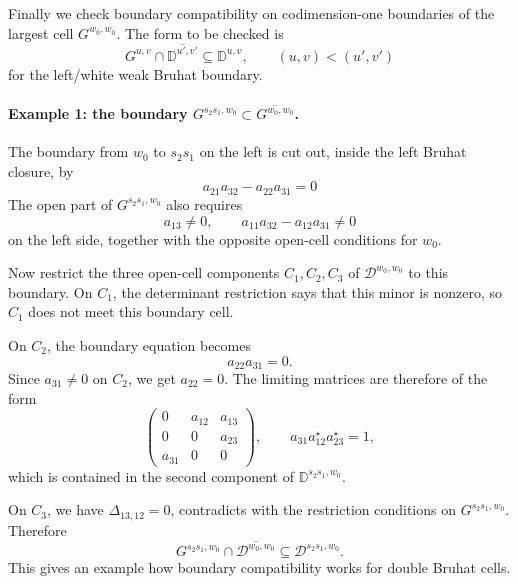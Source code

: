 \documentclass[12pt]{amsart}
\newcommand{\D}{\mathbb D}
\theoremstyle{plain}
\theoremstyle{definition}
\theoremstyle{remark}
\begin{document}
Finally we check boundary compatibility on codimension-one boundaries of the
largest cell $G^{w_0,w_0}$. The form to be checked is
\begin{equation*}
   G^{u,v}\cap \overline{\D^{u',v'}}
   \subseteq
   \D^{u,v},
   \qquad
   (u,v)<(u',v')
\end{equation*}
for the left/white weak Bruhat boundary. 

\paragraph{\bf Example 1: the boundary $G^{s_2s_1,w_0}\subset \overline{G^{w_0,w_0}}$.}
The boundary from $w_0$ to $s_2s_1$ on the left is cut out, inside the left
Bruhat closure, by
\begin{equation*}
   a_{21}a_{32}-a_{22}a_{31}=0
\end{equation*}
The open part of $G^{s_2s_1,w_0}$ also requires
\begin{equation*}
   a_{13}\neq0,\qquad
   a_{11}a_{32}-a_{12}a_{31}\neq 0
\end{equation*}
on the left side, together with the opposite open-cell conditions for $w_0$.

Now restrict the three open-cell components $C_1,C_2,C_3$ of
$\mathcal D^{w_0,w_0}$ to this boundary. On $C_1$, the determinant restriction says that this minor is nonzero, so
$C_1$ does not meet this boundary cell.

On $C_2$, the boundary equation becomes
\begin{equation*}
   a_{22}a_{31}=0.
\end{equation*}
Since $a_{31}\neq0$ on $C_2$, we get $a_{22}=0$. The limiting matrices are
therefore of the form
\begin{equation*}
\begin{pmatrix}
0&a_{12}&a_{13}\\
0&0&a_{23}\\
a_{31}&0&0
\end{pmatrix},
\qquad
a_{31}a_{12}^{\star}a_{23}^{\star}=1,
\end{equation*}
which is contained in the second component of $\D^{s_2s_1,w_0}$.

On $C_3$, we have $\Delta_{13,12}=0$, contradicts with the restriction conditions on $G^{s_2s_1,w_0}$.  Therefore
\begin{equation*}
   G^{s_2s_1,w_0}\cap \overline{\mathcal D^{w_0,w_0}}
   \subseteq
   \mathcal D^{s_2s_1,w_0}.
\end{equation*}
This gives an example how boundary compatibility works for double Bruhat cells.
\end{document}
